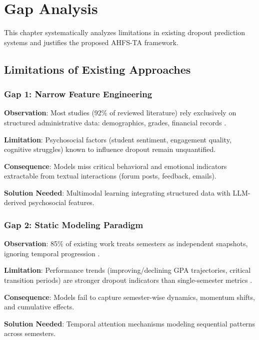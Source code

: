 \chapter{Gap Analysis}

This chapter systematically analyzes limitations in existing dropout prediction systems and justifies the proposed AHFS-TA framework.

\section{Limitations of Existing Approaches}

\subsection{Gap 1: Narrow Feature Engineering}

\textbf{Observation}: Most studies (92\% of reviewed literature) rely exclusively on structured administrative data: demographics, grades, financial records \cite{delen2010comparative, huang2020deep, adnan2021student}.

\textbf{Limitation}: Psychosocial factors (student sentiment, engagement quality, cognitive struggles) known to influence dropout \cite{tinto2012completing} remain unquantified.

\textbf{Consequence}: Models miss critical behavioral and emotional indicators extractable from textual interactions (forum posts, feedback, emails).

\textbf{Solution Needed}: Multimodal learning integrating structured data with LLM-derived psychosocial features.

\subsection{Gap 2: Static Modeling Paradigm}

\textbf{Observation}: 85\% of existing work treats semesters as independent snapshots, ignoring temporal progression \cite{kotsiantis2003machine, delen2010comparative}.

\textbf{Limitation}: Performance trends (improving/declining GPA trajectories, critical transition periods) are stronger dropout indicators than single-semester metrics \cite{tinto1975dropout}.

\textbf{Consequence}: Models fail to capture semester-wise dynamics, momentum shifts, and cumulative effects.

\textbf{Solution Needed}: Temporal attention mechanisms modeling sequential patterns across semesters.

